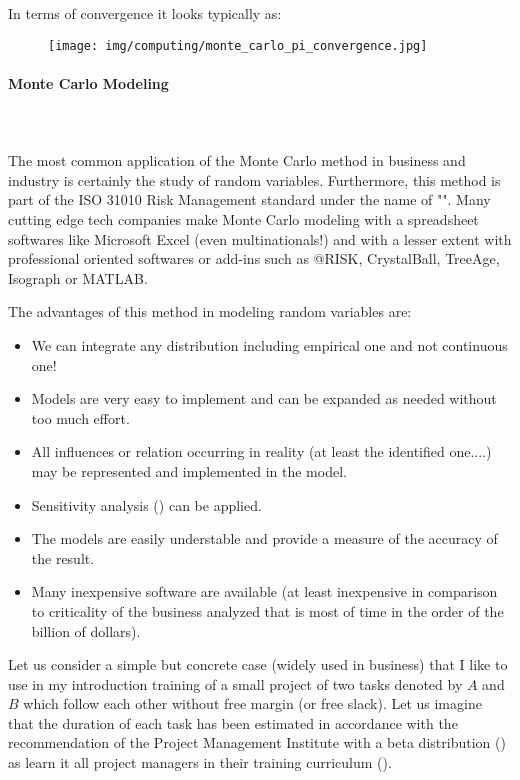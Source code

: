 	
	
	In terms of convergence it looks typically as:
	\begin{figure}[H]
		\centering
		\texttt{[image: img/computing/monte\_carlo\_pi\_convergence.jpg]}
	\end{figure}
	
	\paragraph{Monte Carlo Modeling}\mbox{}\\\\
	The most common application of the Monte Carlo method in business and industry is certainly the study of random variables. Furthermore, this method is part of the ISO 31010 Risk Management standard under the name of "". Many cutting edge tech companies make Monte Carlo modeling with a spreadsheet softwares like Microsoft Excel (even multinationals!) and with a lesser extent with professional oriented softwares or add-ins such as @RISK, CrystalBall, TreeAge, Isograph or MATLAB.
	
	The advantages of this method in modeling random variables are:
	\begin{itemize}
		\item We can integrate any distribution  including empirical one and not continuous one!

		\item Models are very easy to implement and can be expanded as needed without too much effort.

		\item All influences or relation occurring in reality (at least the identified one....) may be represented and implemented in the model.

		\item Sensitivity analysis () can be applied.

		\item The models are easily understable and provide a measure of the accuracy of the result.

		\item Many inexpensive software are available (at least inexpensive in comparison to criticality of the business analyzed that is most of time in the order of the billion of dollars).
	\end{itemize}
	Let us consider a simple but concrete case (widely used in business) that I like to use in my introduction training of a small project of two tasks denoted by $A$ and $B$ which follow each other without free margin (or free slack). Let us imagine that the duration of each task has been estimated in accordance with the recommendation of the Project Management Institute with a beta distribution () as learn it all project managers in their training curriculum ().

